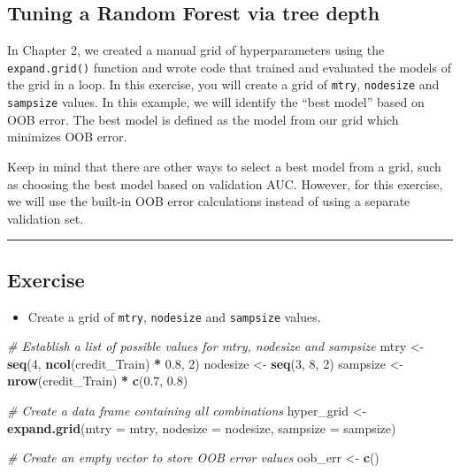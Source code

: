 \documentclass[
]{book}
\newenvironment{Shaded}{\begin{snugshade}}{\end{snugshade}}
\newcommand{\CommentTok}[1]{\textcolor[rgb]{0.56,0.35,0.01}{\textit{#1}}}
\newcommand{\DataTypeTok}[1]{\textcolor[rgb]{0.13,0.29,0.53}{#1}}
\newcommand{\DecValTok}[1]{\textcolor[rgb]{0.00,0.00,0.81}{#1}}
\newcommand{\FloatTok}[1]{\textcolor[rgb]{0.00,0.00,0.81}{#1}}
\newcommand{\KeywordTok}[1]{\textcolor[rgb]{0.13,0.29,0.53}{\textbf{#1}}}
\newcommand{\NormalTok}[1]{#1}
\newcommand{\OperatorTok}[1]{\textcolor[rgb]{0.81,0.36,0.00}{\textbf{#1}}}
\newcommand{\StringTok}[1]{\textcolor[rgb]{0.31,0.60,0.02}{#1}}
\providecommand{\tightlist}{%
  \setlength{\itemsep}{0pt}\setlength{\parskip}{0pt}}
\begin{document}
\hypertarget{tuning-a-random-forest-via-tree-depth}{%
\subsection{Tuning a Random Forest via tree depth}\label{tuning-a-random-forest-via-tree-depth}}

In Chapter 2, we created a manual grid of hyperparameters using the \texttt{expand.grid()} function and wrote code that trained and evaluated the models of the grid in a loop. In this exercise, you will create a grid of \texttt{mtry}, \texttt{nodesize} and \texttt{sampsize} values. In this example, we will identify the ``best model'' based on OOB error. The best model is defined as the model from our grid which minimizes OOB error.

Keep in mind that there are other ways to select a best model from a grid, such as choosing the best model based on validation AUC. However, for this exercise, we will use the built-in OOB error calculations instead of using a separate validation set.

\begin{center}\rule{0.5\linewidth}{0.5pt}\end{center}

\hypertarget{exercise-21}{%
\subsection*{Exercise}\label{exercise-21}}

\begin{itemize}
\tightlist
\item
  Create a grid of \texttt{mtry}, \texttt{nodesize} and \texttt{sampsize} values.
\end{itemize}

\begin{Shaded}
\begin{Highlighting}[]
\CommentTok{# Establish a list of possible values for mtry, nodesize and sampsize}
\NormalTok{mtry <-}\StringTok{ }\KeywordTok{seq}\NormalTok{(}\DecValTok{4}\NormalTok{, }\KeywordTok{ncol}\NormalTok{(credit_Train) }\OperatorTok{*}\StringTok{ }\FloatTok{0.8}\NormalTok{, }\DecValTok{2}\NormalTok{)}
\NormalTok{nodesize <-}\StringTok{ }\KeywordTok{seq}\NormalTok{(}\DecValTok{3}\NormalTok{, }\DecValTok{8}\NormalTok{, }\DecValTok{2}\NormalTok{)}
\NormalTok{sampsize <-}\StringTok{ }\KeywordTok{nrow}\NormalTok{(credit_Train) }\OperatorTok{*}\StringTok{ }\KeywordTok{c}\NormalTok{(}\FloatTok{0.7}\NormalTok{, }\FloatTok{0.8}\NormalTok{)}

\CommentTok{# Create a data frame containing all combinations }
\NormalTok{hyper_grid <-}\StringTok{ }\KeywordTok{expand.grid}\NormalTok{(}\DataTypeTok{mtry =}\NormalTok{ mtry, }\DataTypeTok{nodesize =}\NormalTok{ nodesize, }\DataTypeTok{sampsize =}\NormalTok{ sampsize)}

\CommentTok{# Create an empty vector to store OOB error values}
\NormalTok{oob_err <-}\StringTok{ }\KeywordTok{c}\NormalTok{()}
\end{Highlighting}
\end{Shaded}
\end{document}
